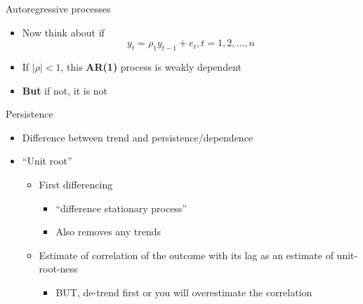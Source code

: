 \documentclass[
  ignorenonframetext,
]{beamer}
\providecommand{\tightlist}{%
  \setlength{\itemsep}{0pt}\setlength{\parskip}{0pt}}
\newcommand{\setsep}{\setlength{\itemsep}{3pt}}
\newcommand{\setskip}{\setlength{\parskip}{3pt}}
\renewcommand{\tightlist}{\setsep\setskip}
\begin{document}
\begin{frame}{Autoregressive processes}
\label{autoregressive-processes}
\pause

\begin{itemize}[<+->]
\tightlist
\item
  Now think about if \[ y_t = \rho_1 y_{t-1} + e_t, t = 1, 2, \dots, n \]
\item
  If \(|\rho| < 1\), this \textbf{AR(1)} process is weakly dependent
\item
  \textbf{But} if not, it is not
\end{itemize}
\end{frame}

\begin{frame}{Persistence}
\label{persistence}
\begin{itemize}[<+->]
\tightlist
\item
  Difference between trend and persistence/dependence
\item
  ``Unit root''

  \begin{itemize}[<+->]
  \tightlist
  \item
    First differencing

    \begin{itemize}[<+->]
    \tightlist
    \item
      ``difference stationary process''
    \item
      Also removes any trends
    \end{itemize}
  \item
    Estimate of correlation of the outcome with its lag as an estimate of unit-root-ness

    \begin{itemize}[<+->]
    \tightlist
    \item
      BUT, de-trend first or you will overestimate the correlation
    \end{itemize}
  \end{itemize}
\end{itemize}
\end{frame}
\end{document}
